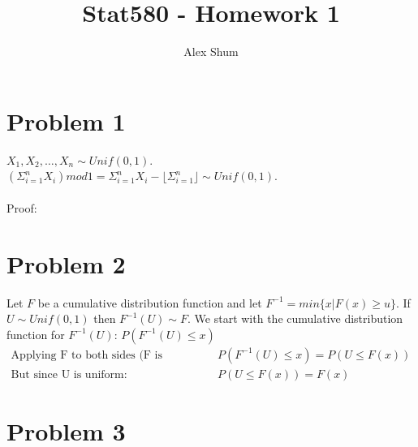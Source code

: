 \documentclass{article}\usepackage[]{graphicx}\usepackage[]{color}
\title{Stat580 - Homework 1}
\author{Alex Shum}
\begin{document}
\maketitle

\section*{Problem 1}
$X_1, X_2, \dots, X_n \sim Unif(0,1)$.  \\
$(\Sigma_{i=1}^n X_i) mod 1 = \Sigma_{i=1}^n X_i - \lfloor \Sigma_{i=1}^n \rfloor \sim Unif(0,1)$. \\
\\
Proof: 

\section*{Problem 2}
Let $F$ be a cumulative distribution function and let $F^{-1} = min\{x | F(x) \ge u\}$.  If $U \sim Unif(0,1)$ then $F^{-1}(U) \sim F$.  We start with the cumulative distribution function for $F^{-1}(U)$: $P(F^{-1}(U) \le x)$
\begin{align*}
\text{Applying F to both sides (F is monotonic): }& P(F^{-1}(U) \le x) = P(U \le F(x))\\
\text{But since U is uniform: }& P(U \le F(x)) = F(x)
\end{align*}

\section*{Problem 3}
\end{document}
